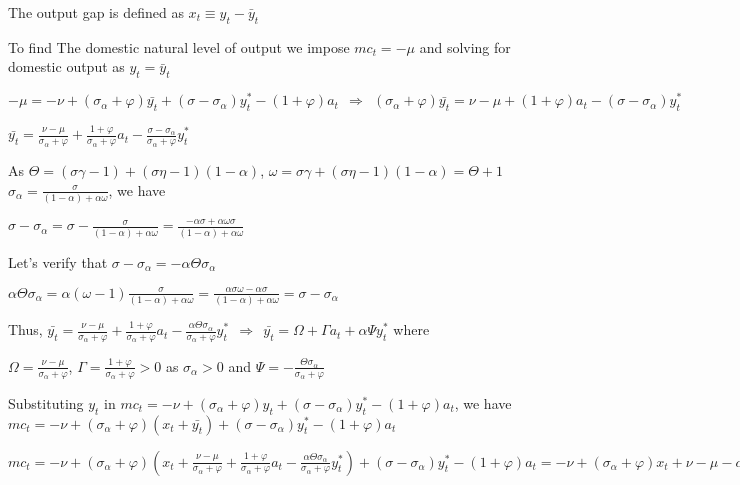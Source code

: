 \documentclass[
]{article}
\begin{document}
The output gap is defined as \(x_t \equiv y_t - \bar{y}_t\)

To find The domestic natural level of output we impose \(mc_t=-\mu\) and
solving for domestic output as \(y_t= \bar{y}_t\)

\(-\mu = -\nu + (\sigma_\alpha+\varphi)\bar{y_t} + (\sigma-\sigma_\alpha)y_t^*-(1+\varphi)a_t \ \ \Rightarrow \ \ (\sigma_\alpha+\varphi)\bar{y_t} = \nu -\mu +(1+\varphi)a_t - (\sigma-\sigma_\alpha)y_t^*\)

\(\displaystyle \bar{y_t} = \frac{\nu -\mu}{\sigma_\alpha+\varphi} + \frac{1+\varphi}{\sigma_\alpha+\varphi}a_t - \frac{\sigma-\sigma_\alpha}{\sigma_\alpha+\varphi}y_t^*\)

As \(\Theta = (\sigma \gamma-1)+(\sigma \eta-1)(1-\alpha)\),
\(\omega=\sigma \gamma+(\sigma \eta-1)(1-\alpha)=\Theta+1\)
\(\displaystyle \sigma_\alpha = \frac{\sigma}{(1-\alpha)+\alpha \omega}\),
we have

\(\displaystyle \sigma-\sigma_\alpha=\sigma- \frac{\sigma}{(1-\alpha)+\alpha \omega}=\frac{-\alpha \sigma +\alpha \omega\sigma}{(1-\alpha)+\alpha \omega}\)

Let's verify that
\(\sigma-\sigma_\alpha = - \alpha \Theta \sigma_\alpha\)

\(\displaystyle \alpha \Theta \sigma_\alpha= \alpha (\omega-1) \frac{\sigma}{(1-\alpha)+\alpha \omega} = \frac{\alpha \sigma \omega -\alpha \sigma}{(1-\alpha)+\alpha \omega}=\sigma-\sigma_\alpha\)

Thus,
\(\displaystyle \bar{y_t} = \frac{\nu -\mu}{\sigma_\alpha+\varphi} + \frac{1+\varphi}{\sigma_\alpha+\varphi}a_t - \frac{ \alpha \Theta \sigma_\alpha}{\sigma_\alpha+\varphi}y_t^* \ \ \Rightarrow \ \ \bar{y_t} =\Omega+\Gamma a_t+ \alpha \Psi y_t^*\)
where

\(\displaystyle \Omega = \frac{\nu -\mu}{\sigma_\alpha+\varphi}\),
\(\displaystyle \Gamma = \frac{1+\varphi}{\sigma_\alpha+\varphi}>0\) as
\(\sigma_\alpha>0\) and
\(\displaystyle \Psi=-\frac{\Theta \sigma_\alpha}{\sigma_\alpha + \varphi}\)

Substituting \(y_t\) in
\(mc_t = -\nu + (\sigma_\alpha+\varphi)y_t + (\sigma-\sigma_\alpha)y_t^*-(1+\varphi)a_t\),
we have
\(mc_t = -\nu + (\sigma_\alpha+\varphi)(x_t+\bar{y_t}) + (\sigma-\sigma_\alpha)y_t^*-(1+\varphi)a_t\)

\(\displaystyle mc_t = -\nu + (\sigma_\alpha+\varphi)\left(x_t+\frac{\nu -\mu}{\sigma_\alpha+\varphi} + \frac{1+\varphi}{\sigma_\alpha+\varphi}a_t - \frac{ \alpha \Theta \sigma_\alpha}{\sigma_\alpha+\varphi}y_t^* \right) + (\sigma-\sigma_\alpha)y_t^*-(1+\varphi)a_t = -\nu + (\sigma_\alpha+\varphi)x_t + \nu - \mu - \alpha \Theta \sigma_\alpha y_t^* + (\sigma-\sigma_\alpha)y_t^*\)
\end{document}
